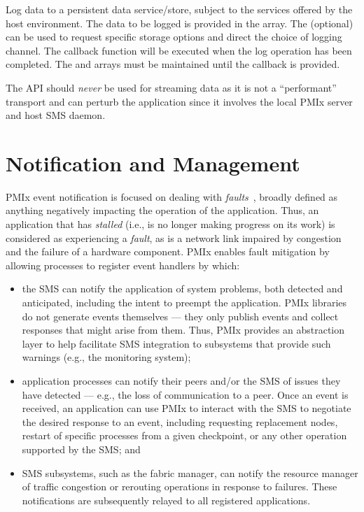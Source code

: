 \descr

Log data to a persistent data service/store, subject to the services offered by the host environment. The data to be logged is provided in the  array. The (optional)  can be used to request specific storage options and direct the choice of logging channel.
The callback function will be executed when the log operation has been completed. The  and  arrays must be maintained until the callback is provided.

\adviceuserstart
The  API should \emph{never} be used for streaming data as it is not a ``performant'' transport and can perturb the application since it involves the local \ac{PMIx} server and host \ac{SMS} daemon.
\adviceuserend


\section{Notification and Management}
\label{chap:api_event:notify}

\ac{PMIx} event notification  is focused on dealing with \textit{faults}~\cite{event1,event2}, broadly defined as anything negatively impacting the operation of the application. Thus, an application that has \textit{stalled} (i.e., is no longer making progress on its work) is considered as experiencing a \textit{fault}, as is a network link impaired by congestion and the failure of a hardware component. \ac{PMIx} enables fault mitigation by allowing processes to register event handlers by which:

\begin{itemize}
\item the \ac{SMS} can notify the application of system problems, both detected and anticipated, including the intent to preempt the application. \ac{PMIx} libraries do not generate events themselves --- they only publish events and collect responses that might arise from them. Thus, \ac{PMIx} provides an abstraction layer to help facilitate \ac{SMS} integration to subsystems that provide such warnings (e.g., the monitoring system);

\item application processes can notify their peers and/or the \ac{SMS} of issues they have detected --- e.g., the loss of communication to a peer. Once an event is received, an application can use \ac{PMIx} to interact with the \ac{SMS} to negotiate the desired response to an event, including requesting replacement nodes, restart of specific processes from a given checkpoint, or any other operation supported by the \ac{SMS}; and

\item \ac{SMS} subsystems, such as the fabric manager, can notify the resource manager of traffic congestion or rerouting operations in response to failures. These notifications are subsequently relayed to all registered applications.
\end{itemize}

